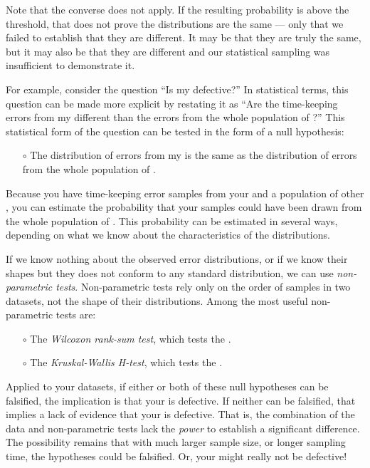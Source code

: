 Note that the converse does not apply. 
If the resulting probability is above the threshold, that does not prove the distributions are the same --- only that we failed to establish that they are different.
It may be that they are truly the same, but it may also be that they are different and our statistical sampling was insufficient to demonstrate it.

For example, consider the question ``Is my \rtc defective?'' 
In statistical terms, this question can be made more explicit by restating it as ``Are the time-keeping errors from my \rtc different than the errors from the whole population of \rtcs?''
This statistical form of the question can be tested in the form of a null hypothesis: 
\begin{itemize}
	\item[$\circ$]The distribution of errors from my \rtc is the same as the distribution of errors from the  whole population of \rtcs.
\end{itemize}
Because you have time-keeping error samples from your \rtc and a population of other \rtcs, you can estimate the probability that your samples could have been drawn from the whole population of \rtcs.
This probability can be estimated in several ways, depending on what we know about the characteristics of the distributions. 

If we know nothing about the observed error distributions, or if we know their shapes but they does not conform to any standard distribution, we can use \emph{non-parametric tests}.
Non-parametric tests rely only on the order of samples in two datasets, not the shape of their distributions.
Among the most useful non-parametric tests are:
\begin{itemize}
	\item[$\circ$] The \emph{Wilcoxon rank-sum test}, which tests the . 
	\item[$\circ$] The \emph{Kruskal-Wallis H-test}, which tests the  .
\end{itemize}
Applied to your datasets, if either or both of these null hypotheses can be falsified, the implication is that your \rtc is defective.
If neither can be falsified, that implies a lack of evidence that your \rtc is defective. 
That is, the combination of the data and non-parametric tests lack the \emph{power} to establish a significant difference.
The possibility remains that with much larger sample size, or longer sampling time, the hypotheses could be falsified. 
Or, your \rtc might really not be defective!

